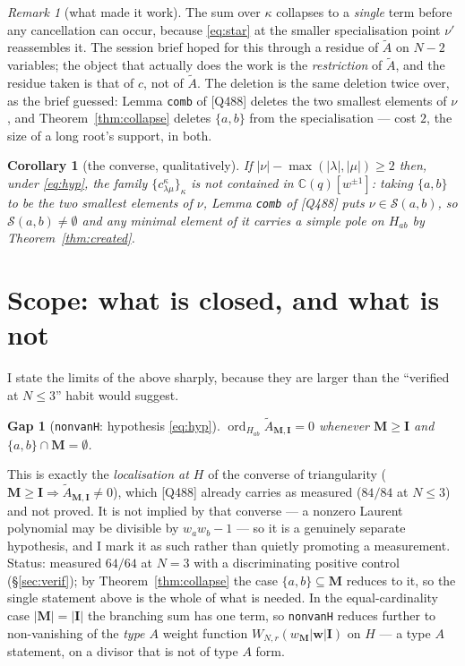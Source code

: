 \documentclass[11pt]{article}
\theoremstyle{plain}
\newtheorem{cor}[thm]{Corollary}
\theoremstyle{definition}
\theoremstyle{remark}
\newtheorem{rem}[thm]{Remark}
\theoremstyle{plain}
\newtheorem{gapthm}{Gap}
\newcommand{\bI}{\mathbf{I}}
\newcommand{\bM}{\mathbf{M}}
\newcommand{\bw}{\mathbf{w}}
\newcommand{\At}{\widetilde{A}}
\newcommand{\ord}{\operatorname{ord}}
\begin{document}
\begin{rem}[what made it work]
The sum over $\kappa$ collapses to a \emph{single} term before any
cancellation can occur, because \eqref{eq:star} at the smaller specialisation
point $\nu'$ reassembles it.  The session brief hoped for this through a
residue of $\At$ on $N-2$ variables; the object that actually does the work is
the \emph{restriction} of $\At$, and the residue taken is that of $c$, not of
$\At$.  The deletion is the same deletion twice over, as the brief guessed:
Lemma \texttt{comb} of [Q488] deletes the two smallest elements of $\nu$, and
Theorem~\ref{thm:collapse} deletes $\{a,b\}$ from the specialisation --- cost
$2$, the size of a long root's support, in both.
\end{rem}

\begin{cor}[the converse, qualitatively]\label{cor:converse}
If $|\nu|-\max(|\lambda|,|\mu|)\ge2$ then, under \eqref{eq:hyp}, the family
$\{c^{\kappa}_{\lambda\mu}\}_{\kappa}$ is not contained in
$\mathbb{C}(q)[w^{\pm1}]$: taking $\{a,b\}$ to be the two smallest elements of
$\nu$, Lemma \texttt{comb} of [Q488] puts $\nu\in\mathcal{S}(a,b)$, so
$\mathcal{S}(a,b)\ne\emptyset$ and any minimal element of it carries a simple
pole on $H_{ab}$ by Theorem~\ref{thm:created}.
\end{cor}

\section{Scope: what is closed, and what is not}
\label{sec:scope}

I state the limits of the above sharply, because they are larger than the
``verified at $N\le3$'' habit would suggest.

\begin{gapthm}[\texttt{nonvanH}: hypothesis \eqref{eq:hyp}]\label{gap:nonvanH}
$\ord_{H_{ab}}\At_{\bM,\bI}=0$ whenever $\bM\ge\bI$ and
$\{a,b\}\cap\bM=\emptyset$.
\end{gapthm}

This is exactly the \emph{localisation at $H$} of the converse of
triangularity ($\bM\ge\bI\Rightarrow\At_{\bM,\bI}\ne0$), which [Q488] already
carries as measured ($84/84$ at $N\le3$) and not proved.  It is not implied by
that converse --- a nonzero Laurent polynomial may be divisible by
$w_aw_b-1$ --- so it is a genuinely separate hypothesis, and I mark it as such
rather than quietly promoting a measurement.  Status: measured
$64/64$ at $N=3$ with a discriminating positive control (\S\ref{sec:verif});
by Theorem~\ref{thm:collapse} the case $\{a,b\}\subseteq\bM$ reduces to it, so
the single statement above is the whole of what is needed.  In the
equal-cardinality case $|\bM|=|\bI|$ the branching sum has one term, so
\texttt{nonvanH} reduces further to non-vanishing of the \emph{type $A$} weight
function $W_{N,r}(w_{\bM}|\bw|\bI)$ on $H$ --- a type $A$ statement, on a
divisor that is not of type $A$ form.
\end{document}
